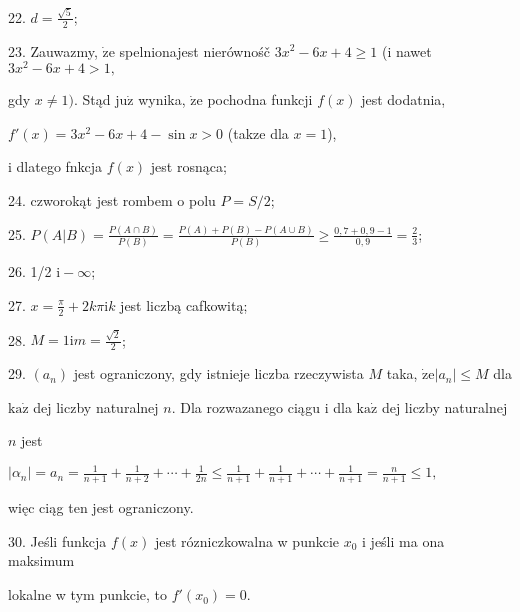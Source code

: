 \documentclass[a4paper,12pt]{article}
\begin{document}
22. $d=\displaystyle \frac{\sqrt{5}}{2}$;

23. Zauwazmy, $\dot{\mathrm{z}}\mathrm{e}$ spelnionajest nierównośč $3x^{2}-6x+4\geq 1$ (i nawet $3x^{2}-6x+4>1,$

gdy $x\neq 1)$. Stąd $\mathrm{j}\mathrm{u}\dot{\mathrm{z}}$ wynika, $\dot{\mathrm{z}}\mathrm{e}$ pochodna funkcji $f(x)$ jest dodatnia,

$f'(x)=3x^{2}-6x+4-\sin x>0$ (takze dla $x=1$),

i dlatego fnkcja $f(x)$ jest rosnąca;

24. czworokąt jest rombem o polu $P=S/2$;

25. $P(A|B)=\displaystyle \frac{P(A\cap B)}{P(B)}=\frac{P(A)+P(B)-P(A\cup B)}{P(B)}\geq\frac{0,7+0,9-1}{0,9}=\frac{2}{3}$;

26. 1/2 $\mathrm{i}-\infty$;

27. $x=\displaystyle \frac{\pi}{2}+2k\pi \mathrm{i}k$ jest liczbą cafkowitą;

28. $M=1\displaystyle \mathrm{i}m=\frac{\sqrt{2}}{2}$;

29. $(a_{n})$ jest ograniczony, gdy istnieje liczba rzeczywista $M$ taka, $\dot{\mathrm{z}}\mathrm{e} |a_{n}| \leq M$ dla

$\mathrm{k}\mathrm{a}\dot{\mathrm{z}}$ dej liczby naturalnej $n$. Dla rozwazanego ciągu i dla $\mathrm{k}\mathrm{a}\dot{\mathrm{z}}$ dej liczby naturalnej

$n$ jest

$|\displaystyle \alpha_{n}|=a_{n}=\frac{1}{n+1}+\frac{1}{n+2}+\cdots+\frac{1}{2n}\leq\frac{1}{n+1}+\frac{1}{n+1}+\cdots+\frac{1}{n+1}=\frac{n}{n+1}\leq 1,$

więc ciąg ten jest ograniczony.

30. Jeśli funkcja $f(x)$ jest rózniczkowalna w punkcie $x_{0}$ i jeśli ma ona maksimum

lokalne w tym punkcie, to $f'(x_{0})=0.$
\end{document}
